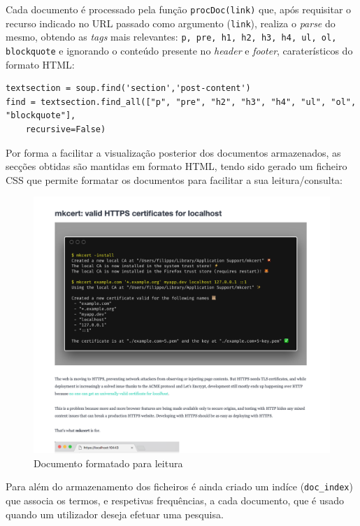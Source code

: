 \documentclass{article}
\begin{document}
Cada documento é processado pela função \texttt{procDoc(link)} que, após requisitar o recurso indicado no URL passado como argumento (\texttt{link}), realiza o
\textit{parse} do mesmo, obtendo as \textit{tags} mais relevantes: \texttt{p, pre, h1, h2, h3, h4, ul, ol, blockquote} e ignorando o conteúdo presente no \textit{header} e \textit{footer},
caraterísticos do formato HTML:
\begin{verbatim}
textsection = soup.find('section','post-content')
find = textsection.find_all(["p", "pre", "h2", "h3", "h4", "ul", "ol", "blockquote"],
    recursive=False) 
\end{verbatim}
Por forma a facilitar a visualização posterior dos documentos armazenados, as secções obtidas são mantidas em formato HTML, tendo sido gerado um ficheiro
CSS que permite formatar os documentos para facilitar a sua leitura/consulta: 
\begin{figure}[H]
    \centering
    \includegraphics[width=12cm]{mkcert_example.png}
    \caption{Documento formatado para leitura}
\end{figure}

Para além do armazenamento dos ficheiros é ainda criado um indíce (\texttt{doc\_index}) que associa os termos, e respetivas frequências, a cada documento, que é usado quando um utilizador deseja efetuar uma pesquisa.
\end{document}
